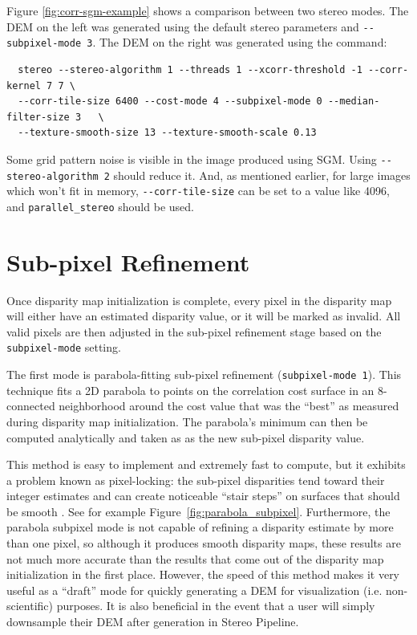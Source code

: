 Figure \ref{fig:corr-sgm-example} shows a comparison between two stereo modes. The DEM on the left was generated using the default stereo parameters and 
  \texttt{-{}-subpixel-mode 3}.  The DEM on the right was generated using the command: 

\begin{verbatim}
  stereo --stereo-algorithm 1 --threads 1 --xcorr-threshold -1 --corr-kernel 7 7 \
  --corr-tile-size 6400 --cost-mode 4 --subpixel-mode 0 --median-filter-size 3   \
  --texture-smooth-size 13 --texture-smooth-scale 0.13
\end{verbatim}

Some grid pattern noise is visible in the image produced using
SGM. Using \texttt{-\/-stereo-algorithm 2} should reduce it. And, as
mentioned earlier, for large images which won't fit in memory,
\texttt{-\/-corr-tile-size} can be set to a value like 4096, and
\texttt{parallel\_stereo} should be used.

\section{Sub-pixel Refinement}
\label{sec:subpixel}

Once disparity map initialization is complete, every pixel in the
disparity map will either have an estimated disparity value, or it
will be marked as invalid.  All valid pixels are then adjusted in the
sub-pixel refinement stage based on the \texttt{subpixel-mode}
setting. %

The first mode is parabola-fitting sub-pixel refinement
(\texttt{subpixel-mode 1}).  This technique fits a 2D parabola to
points on the correlation cost surface in an 8-connected neighborhood
around the cost value that was the ``best'' as measured during
disparity map initialization. The parabola's minimum can then be
computed analytically and taken as as the new sub-pixel disparity
value.

This method is easy to implement and extremely fast to compute, but it
exhibits a problem known as pixel-locking: the sub-pixel disparities
tend toward their integer estimates and can create noticeable ``stair
steps'' on surfaces that should be smooth
\citep{Stein06:attenuating,Szeliski03sampling}.  See
for example Figure~\ref{fig:parabola_subpixel}. Furthermore, the parabola
subpixel mode is not capable of refining a disparity estimate by more
than one pixel, so although it produces smooth disparity maps, these
results are not much more accurate than the results that come out of
the disparity map initialization in the first place.  However, the
speed of this method makes it very useful as a ``draft'' mode for
quickly generating a \ac{DEM} for visualization (i.e. non-scientific)
purposes. It is also beneficial in the event that a user will simply
downsample their DEM after generation in Stereo Pipeline.


